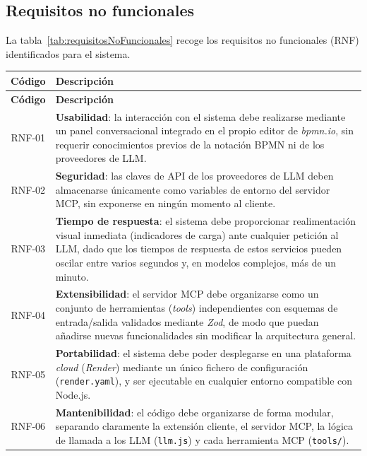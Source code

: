 {%
\subsection{Requisitos no funcionales}
\label{subsec:requisitosNoFuncionales}

La tabla~\ref{tab:requisitosNoFuncionales} recoge los requisitos no funcionales (RNF) identificados para el sistema.

\begin{longtable}{|c|p{11.5cm}|}
\hline
\rowcolor{gray!20} \textbf{Código} & \textbf{Descripción} \\
\hline
\endfirsthead
\hline
\rowcolor{gray!20} \textbf{Código} & \textbf{Descripción} \\
\hline
\endhead
RNF-01 & \textbf{Usabilidad}: la interacción con el sistema debe realizarse mediante un panel conversacional integrado en el propio editor de \textit{bpmn.io}, sin requerir conocimientos previos de la notación BPMN ni de los proveedores de LLM. \\
\hline
RNF-02 & \textbf{Seguridad}: las claves de API de los proveedores de LLM deben almacenarse únicamente como variables de entorno del servidor MCP, sin exponerse en ningún momento al cliente. \\
\hline
RNF-03 & \textbf{Tiempo de respuesta}: el sistema debe proporcionar realimentación visual inmediata (indicadores de carga) ante cualquier petición al LLM, dado que los tiempos de respuesta de estos servicios pueden oscilar entre varios segundos y, en modelos complejos, más de un minuto. \\
\hline
RNF-04 & \textbf{Extensibilidad}: el servidor MCP debe organizarse como un conjunto de herramientas (\textit{tools}) independientes con esquemas de entrada/salida validados mediante \textit{Zod}, de modo que puedan añadirse nuevas funcionalidades sin modificar la arquitectura general. \\
\hline
RNF-05 & \textbf{Portabilidad}: el sistema debe poder desplegarse en una plataforma \textit{cloud} (\textit{Render}) mediante un único fichero de configuración (\texttt{render.yaml}), y ser ejecutable en cualquier entorno compatible con Node.js. \\
\hline
RNF-06 & \textbf{Mantenibilidad}: el código debe organizarse de forma modular, separando claramente la extensión cliente, el servidor MCP, la lógica de llamada a los LLM (\texttt{llm.js}) y cada herramienta MCP (\texttt{tools/}). \\
\hline


\end{longtable}}

